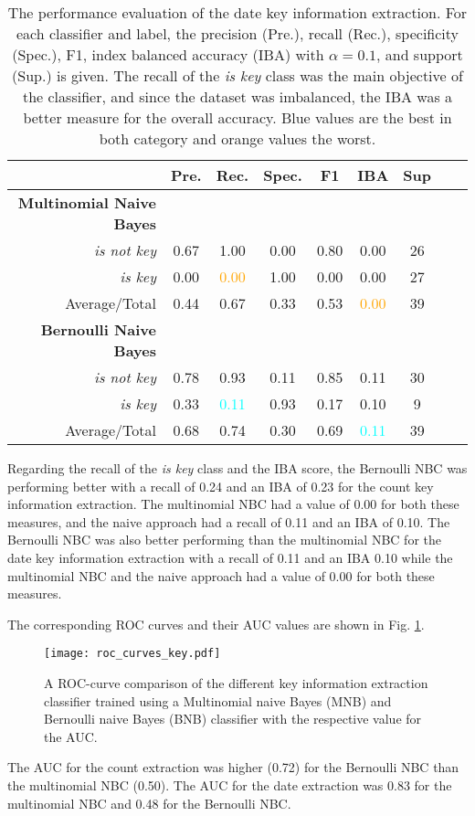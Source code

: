   \begin{table}[h!]
    \caption{The performance evaluation of the date key information extraction. For each classifier and label, the precision (Pre.), recall (Rec.), specificity (Spec.), F1, index balanced accuracy (IBA) with $\alpha = 0.1$, and support (Sup.) is given. The recall of the \textsl{is key} class was the main objective of the classifier, and since the dataset was imbalanced, the IBA was a better measure for the overall accuracy. Blue values are the best in both category and orange values the worst.}
    \centering
    \begin{tabular}{@{}rcccccccc@{}}
      \toprule
       & \textbf{Pre.} & \textbf{Rec.} & \textbf{Spec.}
      & \textbf{F1} & \textbf{IBA}& \textbf{Sup} \\
      \midrule
      \textbf{Multinomial Naive Bayes}\\
      \textsl{is not key}& 0.67& 1.00& 0.00& 0.80& 0.00& 26 \\
      \textsl{is key}& 0.00& \textcolor{orange}{0.00}& 1.00& 0.00& 0.00& 27 \\
      Average/Total& 0.44& 0.67& 0.33& 0.53& \textcolor{orange}{0.00}& 39 \vspace{2mm}\\
      \textbf{Bernoulli Naive Bayes}\\
      \textsl{is not key}& 0.78& 0.93& 0.11& 0.85& 0.11& 30 \\
      \textsl{is key}& 0.33& \textcolor{cyan}{0.11}& 0.93& 0.17& 0.10& 9 \\
      Average/Total& 0.68& 0.74& 0.30& 0.69& \textcolor{cyan}{0.11}& 39 \vspace{2mm}\\
      \bottomrule
    \end{tabular}
  \label{table:keyword_performance_dates}
  \end{table}
  Regarding the recall of the \textsl{is key} class and the IBA score, the Bernoulli NBC was performing better with a recall of 0.24 and an IBA of 0.23 for the count key information extraction. The multinomial NBC had a value of 0.00 for both these measures, and the naive approach had a recall of 0.11 and an IBA of 0.10.
  The Bernoulli NBC was also better performing than the multinomial NBC for the date key information extraction with a recall of 0.11 and an IBA 0.10 while the multinomial NBC and the naive approach had a value of 0.00 for both these measures.

  The corresponding ROC curves and their AUC values are shown in Fig. \ref{fig:roc_key}.
  \begin{figure}[h!]
    \centering
    \texttt{[image: roc\_curves\_key.pdf]}
    \caption{A ROC-curve comparison of the different key information extraction classifier trained using a Multinomial naive Bayes (MNB) and Bernoulli naive Bayes (BNB) classifier with the respective value for the AUC.}
  \label{fig:roc_key}
  \end{figure}
  The AUC for the count extraction was higher (0.72) for the Bernoulli NBC than the multinomial NBC (0.50).
  The AUC for the date extraction was 0.83 for the multinomial NBC and 0.48 for the Bernoulli NBC.

